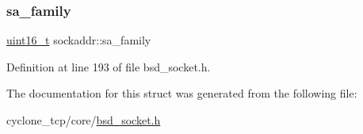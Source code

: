 \mbox{\label{structsockaddr_a24dbd3e20c62f767f18ddaec18ed3b63}} 
\subsubsection{\texorpdfstring{sa\+\_\+family}{sa\_family}}
{\footnotesize\ttfamily \hyperlink{stdint_8h_a273cf69d639a59973b6019625df33e30}{uint16\+\_\+t} sockaddr\+::sa\+\_\+family}



Definition at line 193 of file bsd\+\_\+socket.\+h.



The documentation for this struct was generated from the following file\+:\begin{DoxyCompactItemize}
\item 
cyclone\+\_\+tcp/core/\hyperlink{bsd__socket_8h}{bsd\+\_\+socket.\+h}\end{DoxyCompactItemize}
